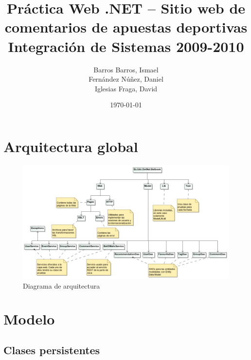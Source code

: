 \documentclass[a4paper,twoside]{article}
\author{Barros Barros, Ismael \\
  Fernández Núñez, Daniel \\
  Iglesias Fraga, David}
\date{\today}
\title{Práctica Web .NET -- Sitio web de comentarios de apuestas deportivas \\ Integración de Sistemas 2009-2010}
\begin{document}
\maketitle
\cleardoublepage
\tableofcontents
\newpage

\section{Arquitectura global}

\begin{figure}[H]
  \centering
  \caption{Diagrama de arquitectura}
  \includegraphics[width=\textheight,angle=90]{img/Arquitectura.png}
\end{figure}


\section{Modelo}


\subsection{Clases persistentes}
\end{document}
